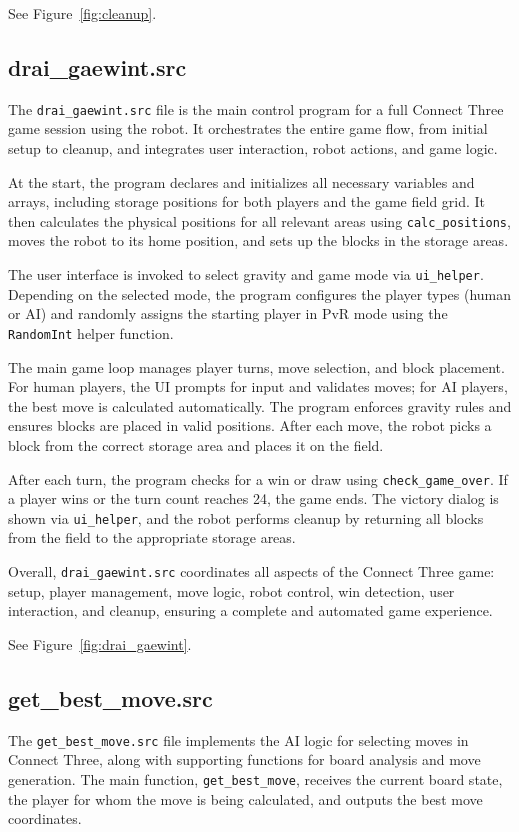 \documentclass{article}
\begin{document}
            See Figure~\ref{fig:cleanup}.

        \subsection{drai\_gaewint.src}
            The \texttt{drai\_gaewint.src} file is the main control program for a full Connect Three game session using the robot. It orchestrates the entire game flow, from initial setup to cleanup, and integrates user interaction, robot actions, and game logic.

            At the start, the program declares and initializes all necessary variables and arrays, including storage positions for both players and the game field grid. It then calculates the physical positions for all relevant areas using \texttt{calc\_positions}, moves the robot to its home position, and sets up the blocks in the storage areas.

            The user interface is invoked to select gravity and game mode via \texttt{ui\_helper}. Depending on the selected mode, the program configures the player types (human or AI) and randomly assigns the starting player in PvR mode using the \texttt{RandomInt} helper function.

            The main game loop manages player turns, move selection, and block placement. For human players, the UI prompts for input and validates moves; for AI players, the best move is calculated automatically. The program enforces gravity rules and ensures blocks are placed in valid positions. After each move, the robot picks a block from the correct storage area and places it on the field.

            After each turn, the program checks for a win or draw using \texttt{check\_game\_over}. If a player wins or the turn count reaches 24, the game ends. The victory dialog is shown via \texttt{ui\_helper}, and the robot performs cleanup by returning all blocks from the field to the appropriate storage areas.

            Overall, \texttt{drai\_gaewint.src} coordinates all aspects of the Connect Three game\@: setup, player management, move logic, robot control, win detection, user interaction, and cleanup, ensuring a complete and automated game experience.

            See Figure~\ref{fig:drai_gaewint}.

        \subsection{get\_best\_move.src}
            The \texttt{get\_best\_move.src} file implements the AI logic for selecting moves in Connect Three, along with supporting functions for board analysis and move generation. The main function, \texttt{get\_best\_move}, receives the current board state, the player for whom the move is being calculated, and outputs the best move coordinates.
\end{document}
